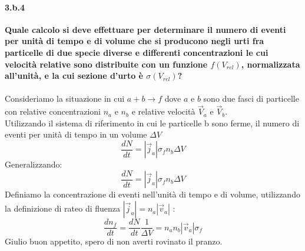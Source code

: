 \documentclass[twoside]{article}
\begin{document}
\paragraph{3.b.4}\textbf{Quale calcolo si deve effettuare per determinare il numero di eventi per unità di tempo e di volume che si producono negli urti fra particelle di due specie diverse e differenti concentrazioni le cui velocità relative sono distribuite con un funzione $f(V_{rel})$, normalizzata all'unità, e la cui sezione d'urto è $\sigma(V_{rel})$?}\\
\\
Consideriamo la situazione in cui $a+b\rightarrow f$ dove $a$ e $b$ sono due fasci di particelle con relative concentrazioni $n_a$ e $n_b$ e relative velocità $\vec{V}_a$ e $\vec{V}_b$.\\
Utilizzando il sistema di riferimento in cui le particelle b sono ferme, il numero di eventi per unità di tempo in un volume $\Delta V$
\begin{equation}
    \frac{dN}{dt}=|\vec{j}_a|\sigma_f n_b\Delta V 
\end{equation}
Generalizzando:
\begin{equation}
    \frac{dN}{dt}=|\vec{j}_a|\sigma_f n_b\Delta V
\end{equation}
Definiamo la concentrazione di eventi nell'unità di tempo e di volume, utilizzando la definizione di rateo di fluenza $|\vec{j}_a|= n_a |\vec{v}_a|$ :
\begin{equation}
    \frac{dn_f}{dt}= \frac{dN}{dt}\frac{1}{\Delta V}=n_an_b|\vec{v}_a|\sigma_f
\end{equation}
Giulio buon appetito, spero di non averti rovinato il pranzo.\\
\end{document}
